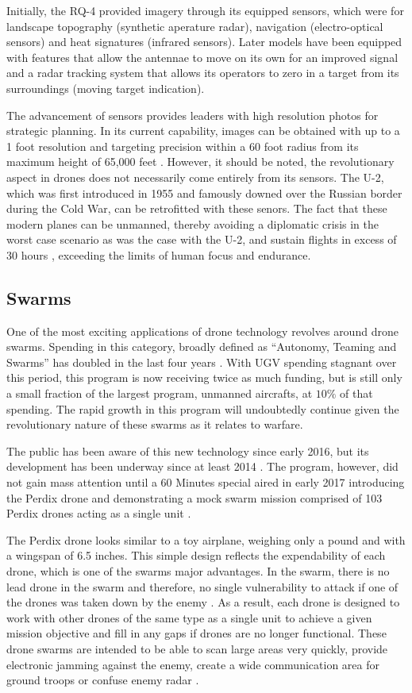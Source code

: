 \documentclass[sigconf]{acmart}
\begin{document}
Initially, the RQ-4 provided imagery through its equipped sensors, which were for landscape topography (synthetic aperature radar), navigation (electro-optical sensors) and heat signatures (infrared sensors). Later models have been equipped with features that allow the antennae to move on its own for an improved signal and a radar tracking system that allows its operators to zero in a target from its surroundings (moving target indication). 

The advancement of sensors provides leaders with high resolution photos for strategic planning. In its current capability, images can be obtained with up to a 1 foot resolution and targeting precision within a 60 foot radius from its maximum height of 65,000 feet \cite{forbesdrone}. However, it should be noted, the revolutionary aspect in drones does not necessarily come entirely from its sensors. The U-2, which was first introduced in 1955 and famously downed over the Russian border during the Cold War, can be retrofitted with these senors. The fact that these modern planes can be unmanned, thereby avoiding a diplomatic crisis in the worst case scenario as was the case with the U-2, and sustain flights in excess of 30 hours \cite{foxtrot}, exceeding the limits of human focus and endurance. 

\subsection{Swarms}
One of the most exciting applications of drone technology revolves around drone swarms. Spending in this category, broadly defined as ``Autonomy, Teaming and Swarms'' has doubled in the last four years \cite{dronebudget}. With UGV spending stagnant over this period, this program is now receiving twice as much funding, but is still only a small fraction of the largest program, unmanned aircrafts, at $10\%$ of that spending. The rapid growth in this program will undoubtedly continue given the revolutionary nature of these swarms as it relates to warfare.

The public has been aware of this new technology since early 2016, but its development has been underway since at least 2014 \cite{washpost}. The program, however, did not gain mass attention until a 60 Minutes special aired in early 2017 introducing the Perdix drone and demonstrating a mock swarm mission comprised of 103 Perdix drones acting as a single unit \cite{60minutes}. 

The Perdix drone looks similar to a toy airplane, weighing only a pound and with a wingspan of 6.5 inches. This simple design reflects the expendability of each drone, which is one of the swarms major advantages. In the swarm, there is no lead drone in the swarm and therefore, no single vulnerability to attack if one of the drones was taken down by the enemy \cite{mitswarm}. As a result, each drone is designed to work with other drones of the same type as a single unit to achieve a given mission objective and fill in any gaps if drones are no longer functional. These drone swarms are intended to be able to scan large areas very quickly, provide electronic jamming against the enemy, create a wide communication area for ground troops or confuse enemy radar \cite{popularmechanics}.
\end{document}
